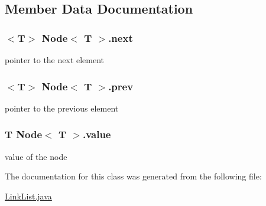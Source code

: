 \subsection{Member Data Documentation}
\subsubsection[{\texorpdfstring{next}{next}}]{$<$T$>$ {\bf Node}$<$ T $>$.next\hspace{0.3cm}{\ttfamily [private]}}\hypertarget{classNode_a2b7406e38faf070c2622a17670863f1e}{}\label{classNode_a2b7406e38faf070c2622a17670863f1e}
pointer to the next element 
\subsubsection[{\texorpdfstring{prev}{prev}}]{$<$T$>$ {\bf Node}$<$ T $>$.prev\hspace{0.3cm}{\ttfamily [private]}}\hypertarget{classNode_ad309e9a49a7df9d1b00be69b4292ddeb}{}\label{classNode_ad309e9a49a7df9d1b00be69b4292ddeb}
pointer to the previous element 
\subsubsection[{\texorpdfstring{value}{value}}]{\setlength{\rightskip}{0pt plus 5cm}T {\bf Node}$<$ T $>$.value\hspace{0.3cm}{\ttfamily [private]}}\hypertarget{classNode_a34f6f13762391af4b29df43a42d675fd}{}\label{classNode_a34f6f13762391af4b29df43a42d675fd}
value of the node 

The documentation for this class was generated from the following file\+:\begin{DoxyCompactItemize}
\item 
\hyperlink{LinkList_8java}{Link\+List.\+java}\end{DoxyCompactItemize}

